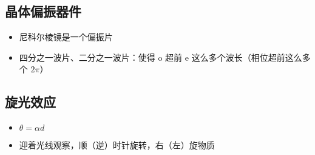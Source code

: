 \documentclass{article}
\begin{document}
\subsection{晶体偏振器件}

\begin{itemize}
    \item 尼科尔棱镜是一个偏振片
    \item 四分之一波片、二分之一波片：使得 o 超前 e 这么多个波长（相位超前这么多个 $2\pi$）
\end{itemize}

\subsection{旋光效应}

\begin{itemize}
    \item $\theta=\alpha d$
    \item 迎着光线观察，顺（逆）时针旋转，右（左）旋物质
\end{itemize}
\end{document}
